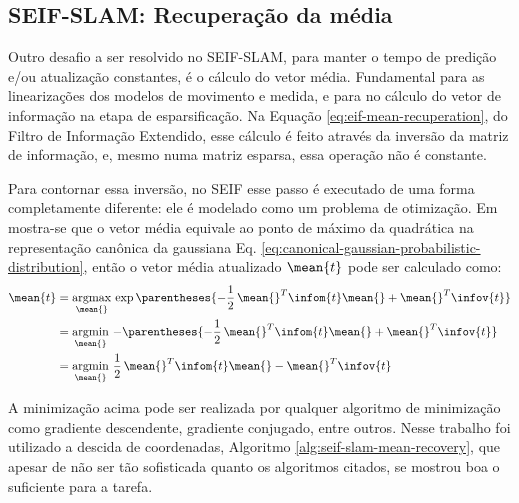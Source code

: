 \subsection{SEIF-SLAM: Recuperação da média}
\label{sec:seif-mean-recovery}
Outro desafio a ser resolvido no SEIF-SLAM, para manter o tempo de 
predição e/ou atualização constantes, é o cálculo do vetor média. 
Fundamental para as linearizações dos modelos de movimento e medida, e para no cálculo do vetor de informação na etapa de esparsificação. Na Equação 
\ref{eq:eif-mean-recuperation}, do Filtro de Informação Extendido, esse cálculo 
é feito através da inversão da matriz de informação, 
e, mesmo numa matriz esparsa, essa operação não é constante.

Para contornar essa inversão, no SEIF esse passo é executado de uma forma completamente diferente: ele é modelado como um problema de otimização. Em 
\cite[Cap.~12.6]{bongard2006probabilistic} mostra-se que o vetor média equivale 
ao ponto de máximo da quadrática na representação canônica da gaussiana 
Eq. \ref{eq:canonical-gaussian-probabilistic-distribution}, então o 
vetor média atualizado $\mean{t}$ pode ser calculado como:
\begin{equation}
  \begin{aligned}
    \mean{t} &= \mathop{\mathrm{argmax}}\limits_{\mean{}} \,\exp\parentheses{-\frac{1}{2}\,\mean{}^T\infom{t}\mean{} 
    + \mean{}^T \infov{t}}\\
    &= \mathop{\mathrm{argmin}}\limits_{\mean{}}\, - \parentheses{-\frac{1}{2}\,\mean{}^T\infom{t}\mean{} 
    + \mean{}^T \infov{t}}\\
    &= \mathop{\mathrm{argmin}}\limits_{\mean{}}\, \frac{1}{2}\,\mean{}^T\infom{t}\mean{} 
    - \mean{}^T \infov{t}
  \end{aligned}
  \label{eq:seif-mean-recuperation}
\end{equation}

A minimização acima pode ser realizada por qualquer algoritmo de 
minimização como gradiente descendente, gradiente conjugado, entre 
outros. Nesse trabalho foi utilizado a descida de coordenadas, Algoritmo \ref{alg:seif-slam-mean-recovery}, que apesar de não ser tão sofisticada 
quanto os algoritmos citados, se mostrou boa o suficiente para a tarefa.

